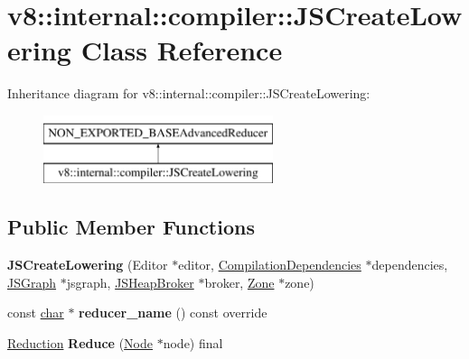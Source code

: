 \hypertarget{classv8_1_1internal_1_1compiler_1_1JSCreateLowering}{}\section{v8\+:\+:internal\+:\+:compiler\+:\+:J\+S\+Create\+Lowering Class Reference}
\label{classv8_1_1internal_1_1compiler_1_1JSCreateLowering}
Inheritance diagram for v8\+:\+:internal\+:\+:compiler\+:\+:J\+S\+Create\+Lowering\+:\begin{figure}[H]
\begin{center}
\leavevmode
\includegraphics[height=2.000000cm]{classv8_1_1internal_1_1compiler_1_1JSCreateLowering}
\end{center}
\end{figure}
\subsection*{Public Member Functions}
\begin{DoxyCompactItemize}
\item 
\mbox{\label{classv8_1_1internal_1_1compiler_1_1JSCreateLowering_a3870107db2d075079199fe413840e441}} 
{\bfseries J\+S\+Create\+Lowering} (Editor $\ast$editor, \mbox{\hyperlink{classv8_1_1internal_1_1compiler_1_1CompilationDependencies}{Compilation\+Dependencies}} $\ast$dependencies, \mbox{\hyperlink{classv8_1_1internal_1_1compiler_1_1JSGraph}{J\+S\+Graph}} $\ast$jsgraph, \mbox{\hyperlink{classv8_1_1internal_1_1compiler_1_1JSHeapBroker}{J\+S\+Heap\+Broker}} $\ast$broker, \mbox{\hyperlink{classv8_1_1internal_1_1Zone}{Zone}} $\ast$zone)
\item 
\mbox{\label{classv8_1_1internal_1_1compiler_1_1JSCreateLowering_ab238a3f021ec20a7ec7e81c4b1513ea3}} 
const \mbox{\hyperlink{classchar}{char}} $\ast$ {\bfseries reducer\+\_\+name} () const override
\item 
\mbox{\label{classv8_1_1internal_1_1compiler_1_1JSCreateLowering_a61676b71f60e5a2c69c9bc3a1d35c7fc}} 
\mbox{\hyperlink{classv8_1_1internal_1_1compiler_1_1Reduction}{Reduction}} {\bfseries Reduce} (\mbox{\hyperlink{classv8_1_1internal_1_1compiler_1_1Node}{Node}} $\ast$node) final
\end{DoxyCompactItemize}


